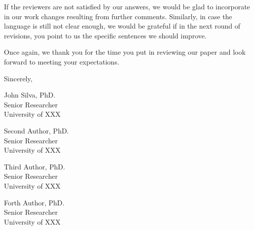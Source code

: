 \documentclass[11pt,a4paper,roman]{moderncv}
\begin{document}
\vspace{0.5cm}

If the reviewers are not satisfied by our answers, we would be glad to
incorporate in our work changes resulting from further comments. Similarly, in
case the language is still not clear enough, we would be grateful if in the
next round of revisions, you point to us the specific sentences we should
improve.

Once again, we thank you for the time you put in reviewing our paper and look
forward to meeting your expectations.

\vspace{0.5cm}

Sincerely,

\vspace{0.5cm}

\begin{minipage}[t]{0.45\linewidth}
John Silva, PhD. \\
Senior Researcher \\
University of XXX
\end{minipage}
\hfill
\begin{minipage}[t]{0.45\linewidth}
Second Author, PhD. \\
Senior Researcher \\
University of XXX
\end{minipage}

\vspace{0.5cm}

\begin{minipage}[t]{0.45\linewidth}
Third Author, PhD. \\
Senior Researcher \\
University of XXX
\end{minipage}
\hfill
\begin{minipage}[t]{0.45\linewidth}
Forth Author, PhD. \\
Senior Researcher \\
University of XXX
\end{minipage}
\end{document}

